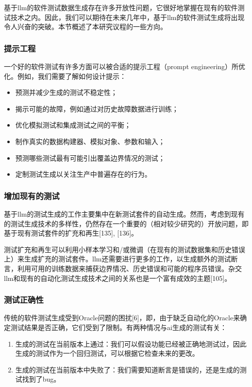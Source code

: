 \begin{translation}
基于llm的软件测试数据生成存在许多开放性问题，它很好地掌握在现有的软件测试技术之内。因此，我们可以期待在未来几年中，基于llm的软件测试生成将出现令人兴奋的突破。本节概述了本研究议程的一些方向。

\subsubsection{提示工程}

一个好的软件测试有许多方面可以被合适的提示工程（prompt engineering）所优化。例如，我们需要了解如何设计提示：
\begin{itemize}
    \item 预测并减少生成的测试不稳定性；
    \item 揭示可能的故障，例如通过对历史故障数据进行训练；
    \item 优化模拟测试和集成测试之间的平衡；
    \item 制作真实的数据构建器、模拟对象、参数和输入；
    \item 预测哪些测试最有可能引出覆盖边界情况的测试；
    \item 定制测试生成以关注生产中普遍存在的行为。
\end{itemize}

\subsubsection{增加现有的测试}

基于llm的测试生成的工作主要集中在新测试套件的自动生成。然而，考虑到现有的测试生成技术的多样性，仍然存在一个重要的（相对较少研究的）开放问题，即基于现有测试套件的扩充和再生[135], [136]。

测试扩充和再生可以利用小样本学习和/或微调（在现有的测试数据集和历史错误上）来生成扩充的测试套件。llm还需要进行更多的工作，以生成额外的测试断言，利用可用的训练数据来捕获边界情况、历史错误和可能的程序员错误。杂交llm和现有的自动化测试生成技术之间的关系也是一个富有成效的主题[105]。

\subsubsection{测试正确性}

传统的软件测试生成受到Oracle问题的困扰[6]，即，由于缺乏自动化的Oracle来确定测试结果是否正确，它们受到了限制。有两种情况与ai生成的测试有关：
\begin{enumerate}
    \item 生成的测试在当前版本上通过：我们可以假设功能已经被正确地测试过，因此生成的测试作为一个回归测试，可以根据它检查未来的更改。
    \item 生成的测试在当前版本中失败了：我们需要知道断言是错误的，还是生成的测试找到了bug。
\end{enumerate}


\end{translation}
